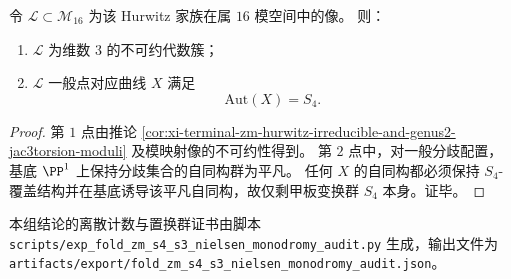 \begin{conclusion}[模空间像的不可约性与一般点自同构群]\label{con:xi-terminal-zm-m16-locus-irreducible-generic-aut-s4}
令 \(\mathcal L\subset \mathcal M_{16}\) 为该 Hurwitz 家族在属 \(16\) 模空间中的像。
则：
\begin{enumerate}
  \item \(\mathcal L\) 为维数 \(3\) 的不可约代数簇；
  \item \(\mathcal L\) 一般点对应曲线 \(X\) 满足
  \[
  \mathrm{Aut}(X)=S_4.
  \]
\end{enumerate}
\end{conclusion}
\begin{proof}
第 \(1\) 点由推论
\ref{cor:xi-terminal-zm-hurwitz-irreducible-and-genus2-jac3torsion-moduli}
及模映射像的不可约性得到。
第 \(2\) 点中，对一般分歧配置，基底 \(\PP^1\) 上保持分歧集合的自同构群为平凡。
任何 \(X\) 的自同构都必须保持 \(S_4\)-覆盖结构并在基底诱导该平凡自同构，故仅剩甲板变换群 \(S_4\) 本身。证毕。
\end{proof}

\begin{remark}[可复现证书路径]\label{rem:xi-terminal-zm-s4-s3-nielsen-monodromy-certificate-path}
本组结论的离散计数与置换群证书由脚本
\texttt{scripts/exp\_fold\_zm\_s4\_s3\_nielsen\_monodromy\_audit.py}
生成，输出文件为
\texttt{artifacts/export/fold\_zm\_s4\_s3\_nielsen\_monodromy\_audit.json}。
\end{remark}

\endinput
